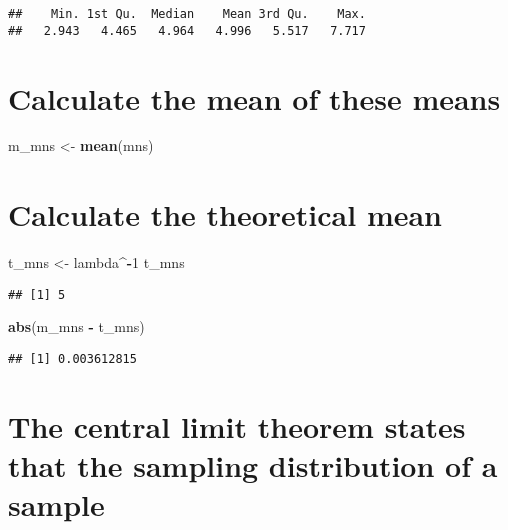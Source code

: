 \documentclass[
]{article}
\newenvironment{Shaded}{\begin{snugshade}}{\end{snugshade}}
\newcommand{\DecValTok}[1]{\textcolor[rgb]{0.00,0.00,0.81}{#1}}
\newcommand{\KeywordTok}[1]{\textcolor[rgb]{0.13,0.29,0.53}{\textbf{#1}}}
\newcommand{\NormalTok}[1]{#1}
\newcommand{\OperatorTok}[1]{\textcolor[rgb]{0.81,0.36,0.00}{\textbf{#1}}}
\newcommand{\StringTok}[1]{\textcolor[rgb]{0.31,0.60,0.02}{#1}}
\begin{document}
\begin{verbatim}
##    Min. 1st Qu.  Median    Mean 3rd Qu.    Max. 
##   2.943   4.465   4.964   4.996   5.517   7.717
\end{verbatim}

\hypertarget{calculate-the-mean-of-these-means}{%
\section{Calculate the mean of these
means}\label{calculate-the-mean-of-these-means}}

\begin{Shaded}
\begin{Highlighting}[]
\NormalTok{m_mns <-}\StringTok{ }\KeywordTok{mean}\NormalTok{(mns)}
\end{Highlighting}
\end{Shaded}

\hypertarget{calculate-the-theoretical-mean}{%
\section{Calculate the theoretical
mean}\label{calculate-the-theoretical-mean}}

\begin{Shaded}
\begin{Highlighting}[]
\NormalTok{t_mns <-}\StringTok{ }\NormalTok{lambda}\OperatorTok{^-}\DecValTok{1}
\NormalTok{t_mns}
\end{Highlighting}
\end{Shaded}

\begin{verbatim}
## [1] 5
\end{verbatim}

\begin{Shaded}
\begin{Highlighting}[]
\KeywordTok{abs}\NormalTok{(m_mns }\OperatorTok{-}\StringTok{ }\NormalTok{t_mns)}
\end{Highlighting}
\end{Shaded}

\begin{verbatim}
## [1] 0.003612815
\end{verbatim}

\hypertarget{the-central-limit-theorem-states-that-the-sampling-distribution-of-a-sample}{%
\section{The central limit theorem states that the sampling distribution
of a
sample}\label{the-central-limit-theorem-states-that-the-sampling-distribution-of-a-sample}}
\end{document}
